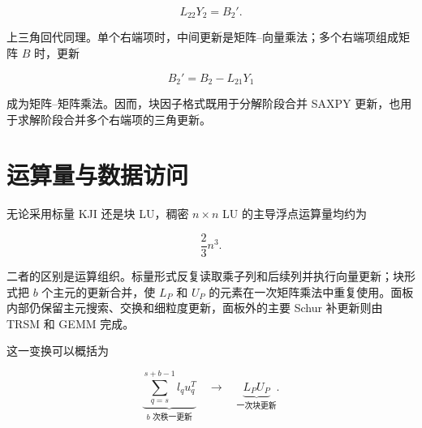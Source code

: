 \[
L_{22}Y_2=B_2'.
\]

上三角回代同理。单个右端项时，中间更新是矩阵--向量乘法；多个右端项组成矩阵 $B$ 时，更新

\[
B_2' = B_2-L_{21}Y_1
\]

成为矩阵--矩阵乘法。因而，块因子格式既用于分解阶段合并 SAXPY 更新，也用于求解阶段合并多个右端项的三角更新。

\section{运算量与数据访问}

无论采用标量 KJI 还是块 LU，稠密 $n\times n$ LU 的主导浮点运算量均约为

\[
\frac{2}{3}n^3.
\]

二者的区别是运算组织。标量形式反复读取乘子列和后续列并执行向量更新；块形式把 $b$ 个主元的更新合并，使 $L_P$ 和 $U_P$ 的元素在一次矩阵乘法中重复使用。面板内部仍保留主元搜索、交换和细粒度更新，面板外的主要 Schur 补更新则由 TRSM 和 GEMM 完成。

这一变换可以概括为

\[
\underbrace{\sum_{q=s}^{s+b-1}l_qu_q^T}_{b\text{ 次秩一更新}}
\quad\longrightarrow\quad
\underbrace{L_PU_P}_{\text{一次块更新}}.
\]
